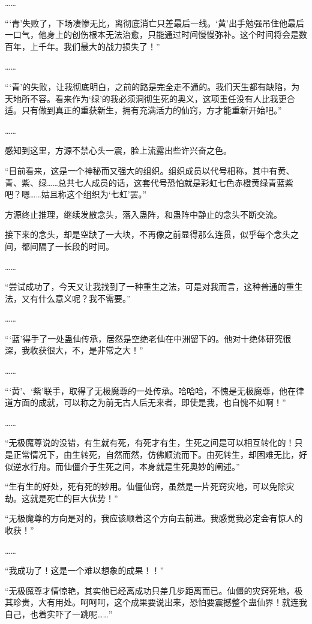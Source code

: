 \begin{this_body}
……

“‘青’失败了，下场凄惨无比，离彻底消亡只差最后一线。‘黄’出手勉强吊住他最后一口气，他身上的创伤根本无法治愈，只能通过时间慢慢弥补。这个时间将会是数百年，上千年。我们最大的战力损失了！”

……

“‘青’的失败，让我彻底明白，之前的路是完全走不通的。我们天生都有缺陷，为天地所不容。看来作为‘绿’的我必须洞彻生死的奥义，这项重任没有人比我更合适。只有做到真正的重获新生，拥有充满活力的仙窍，方才能重新开始吧。”

……

感知到这里，方源不禁心头一震，脸上流露出些许兴奋之色。

“目前看来，这是一个神秘而又强大的组织。组织成员以代号相称，其中有黄、青、紫、绿……总共七人成员的话，这套代号恐怕就是彩虹七色赤橙黄绿青蓝紫吧？嗯……姑且称这个组织为‘七虹’罢。”

方源终止推理，继续发散念头，落入蛊阵，和蛊阵中静止的念头不断交流。

接下来的念头，却是空缺了一大块，不再像之前显得那么连贯，似乎每个念头之间，都间隔了一长段的时间。

……

“尝试成功了，今天又让我找到了一种重生之法，可是对我而言，这种普通的重生法，又有什么意义呢？我不需要。”

……

“‘蓝’得手了一处蛊仙传承，居然是空绝老仙在中洲留下的。他对十绝体研究很深，我收获很大，不，是非常之大！”

……

“‘黄’、‘紫’联手，取得了无极魔尊的一处传承。哈哈哈，不愧是无极魔尊，他在律道方面的成就，可以称之为前无古人后无来者，即使是我，也自愧不如啊！”

……

“无极魔尊说的没错，有生就有死，有死才有生，生死之间是可以相互转化的！只是正常情况下，由生转死，自然而然，仿佛顺流而下。由死转生，却困难无比，好似逆水行舟。而仙僵介于生死之间，本身就是生死奥妙的阐述。”

“生有生的好处，死有死的妙用。仙僵仙窍，虽然是一片死窍灾地，可以免除灾劫。这就是死亡的巨大优势！”

“无极魔尊的方向是对的，我应该顺着这个方向去前进。我感觉我必定会有惊人的收获！”

……

“我成功了！这是一个难以想象的成果！！”

“无极魔尊才情惊艳，其实他已经离成功只差几步距离而已。仙僵的灾窍死地，极其珍贵，大有用处。呵呵呵，这个成果要说出来，恐怕要震撼整个蛊仙界！就连我自己，也着实吓了一跳呢……”


\end{this_body}
